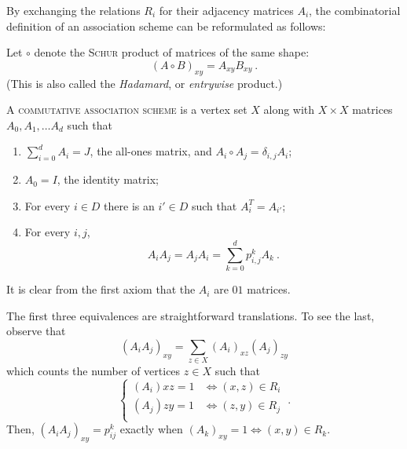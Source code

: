\documentclass{report}
\begin{document}
    By exchanging the relations $R_i$ for their adjacency matrices $A_i$, the
    combinatorial definition of an association scheme can be reformulated as
    follows:

    \begin{defn}
      \label{association-scheme-alg}
      Let $\circ$ denote the \textsc{Schur} product of matrices of the same shape:
      \begin{equation}\label{schur-prod}
        (A \circ B)_{xy} = A_{xy} B_{xy}
        \ .
      \end{equation}
      (This is also called the \textit{Hadamard}, or \textit{entrywise} product.)

      A \textsc{commutative association scheme} is a vertex set $X$ along with
      $X \times X$ matrices $A_0, A_1, \ldots A_d$ such that
      \begin{enumerate}
        \item $\displaystyle \sum_{i=0}^d A_i = J$, the all-ones matrix,
          and $A_i \circ A_j = \delta_{i, j} A_i$;
          \label{aAS-part}
        \item $A_0 = I$, the identity matrix;
          \label{aAS-diag}
        \item For every $i \in D$ there is an $i' \in D$ such that $A_i^T =
          A_{i'}$;
          \label{aAS-sym}
        \item For every $i, j$,
          $$
            A_i A_j = A_j A_i = \sum_{k = 0}^d p_{i, j}^k A_k
            \ .
          $$
          \label{aAS-reg}
      \end{enumerate}
    \end{defn}

    It is clear from the first axiom that the $A_i$ are $01$ matrices.

    The first three equivalences are straightforward translations.  To see the
    last, observe that
    $$
      (A_i A_j)_{xy} = \sum_{z \in X} (A_i)_{xz} (A_j)_{zy}
    $$
    which counts the number of vertices $z \in X$ such that
    $$
      \begin{cases}
        (A_i){xz} = 1 & \iff (x, z) \in R_i \\
        (A_j){zy} = 1 & \iff (z, y) \in R_j \\
      \end{cases}\ .
    $$
    Then, $(A_i A_j)_{xy} = p_{ij}^k$ exactly when $(A_k)_{xy} = 1 \iff (x, y)
    \in R_k$.
    \\
\end{document}
